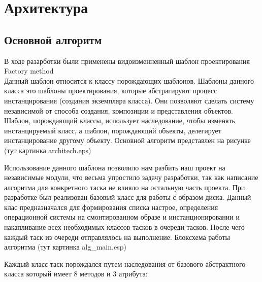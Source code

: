 
\chapter{Архитектура}

\section{Основной алгоритм}
В ходе разарботки были применены видоизменненный шаблон проектирования Factory method\\

Данный шаблон относится к классу порождающих шаблонов. Шаблоны данного класса это шаблоны проектирования, которые абстрагируют процесс инстанцирования (создания экземпляра класса). Они позволяют сделать систему независимой от способа создания, композиции и представления объектов. Шаблон, порождающий классы, использует наследование, чтобы изменять инстанцируемый класс, а шаблон, порождающий объекты, делегирует инстанцирование другому объекту.
Основной алгоритм представлен на рисунке (тут картинка architech.eps)

Использование данного шаблона позволило нам разбить наш проект на независимые модули, что весьма упростило задачу разработки, так как написание алгоритма для конкретного таска не влияло на остальную часть проекта. При разработке был реализован базовый класс для работы с образом диска. Данный клас предназначался для формирования списка настрое, определения операционной системы на смонтированном образе и инстанционировании и накапливание всех необходимых классов-тасков в очереди тасков. После чего каждый таск из очереди отправлялось на выполнение. Блоксхема работы алгоритма (тут картинка alg_main.esp)

Каждый класс-таск порождался путем наследования от базового абстрактного класса который имеет 8 методов и 3 атрибута:

